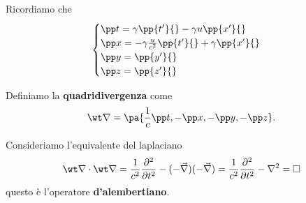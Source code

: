 Ricordiamo che
\[\begin{cases}
\pp t{}=\gamma\pp{t'}{}-\gamma u\pp{x'}{}\\
\pp x{}=-\gamma \frac{u}{c^2}\pp{t'}{}+\gamma \pp{x'}{}\\
\pp y{}=\pp {y'}{}\\
\pp z{}=\pp {z'}{}
\end{cases}\]

\begin{definition}[Quadrigradiente]
Definiamo la \textbf{quadridivergenza} come
\[\wt \nabla=\pa{\frac1c\pp t{},-\pp x{},-\pp y{},-\pp z{}}.\]
\end{definition}

\begin{remark}
Consideriamo l'equivalente del laplaciano
\[\wt \nabla\cdot\wt\nabla=\frac1{c^2}\pps[2]t{}-(-\vec\nabla)(-\vec \nabla)=\frac1{c^2}\pps[2]t{}-\nabla^2=\square\]
questo \`e l'operatore \textbf{d'alembertiano}.
\end{remark}


